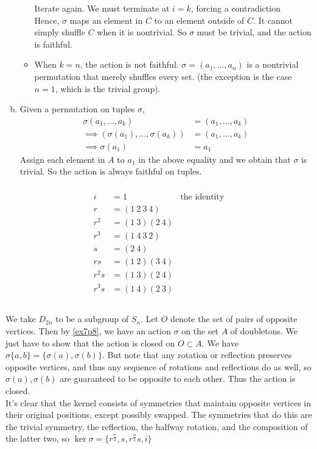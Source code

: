 \documentclass{article}
\newcommand{\set}[1]{ \{ #1 \} }
\begin{document}
\begin{enumerate}[(a)]
\begin{itemize}
Iterate again. We must terminate at $i=k$, forcing a contradiction\\
Hence, $\sigma$ maps an element in $C$ to an element outside of $C$. It cannot simply shuffle $C$ when it is nontrivial. So $\sigma$ must be trivial, and the action is faithful.
\item When $k=n$, the action is not faithful. $\sigma = (a_1,\ldots,a_n)$ is a nontrivial permutation that merely shuffles every set. (the exception is the case $n=1$, which is the trivial group).
\end{itemize}
\item
Given a permutation on tuples $\sigma$, 
\begin{align*}
\sigma(a_1,\ldots,a_k) &= (a_1,\ldots,a_k)\\
\implies (\sigma(a_1),\ldots,\sigma(a_k)) &= (a_1,\ldots,a_k)\\
\implies \sigma(a_1) &= a_1
\end{align*}
Assign each element in $A$ to $a_1$ in the above equality and we obtain that $\sigma$ is trivial. So the action is always faithful on tuples.
\end{enumerate}
\subsubsection{}\label{ex7p11}
\begin{align*}
i &= 1 & \mbox{the identity}\\
r &= (1\ 2\ 3\ 4)\\
r^2 &= (1\ 3) (2\ 4)\\
r^3 &= (1\ 4\ 3\ 2)\\
s &= (2\ 4)\\
rs &= (1\ 2)(3\ 4)\\
r^2s &= (1\ 3)(2\ 4)\\
r^3s &= (1\ 4)(2\ 3)\\
\end{align*}
\subsubsection{}\label{ex7p12}
We take $D_{2n}$ to be a subgroup of $S_n$. Let $O$ denote the set of pairs of opposite vertices. Then by \ref{ex7p8}, we have an action $\sigma$ on the set $A$ of doubletons. We just have to show that the action is closed on $O \subset A$. We have $\sigma\set{a,b} = \set{\sigma(a),\sigma(b)}$. But note that any rotation or reflection preserves opposite vertices, and thus any sequence of rotations and reflections do as well, so $\sigma(a),\sigma(b)$ are guaranteed to be opposite to each other. Thus the action is closed.\\
It's clear that the kernel consists of symmetries that maintain opposite vertices in their original positions, except possibly swapped. The symmetries that do this are the trivial symmetry, the reflection, the halfway rotation, and the composition of the latter two, so $\ker\sigma = \set{r^{\frac{n}{2}}, s, r^{\frac{n}{2}}s, i}$
\end{document}
